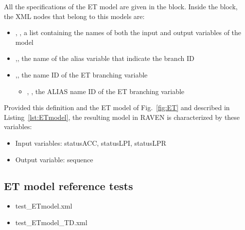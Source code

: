 All the specifications of the ET model are given in the 
 block. 
Inside the  block, the XML
nodes that belong to this models are:
\begin{itemize}
  \item  {}, , a list containing the names of both the input and output variables of the model
  \item  {},, the name of the alias variable that indicate the branch ID
  \item  {},, the name ID of the ET branching variable
	  \begin{itemize}
	    \item {}, , the ALIAS name ID of the ET branching variable
	  \end{itemize}
\end{itemize}

Provided this definition and the ET model of Fig.~\ref{fig:ET} and described in Listing~\ref{lst:ETmodel}, 
the resulting model in RAVEN is characterized by these variables:
\begin{itemize}
	\item Input variables: statusACC, statusLPI, statusLPR
	\item Output variable: sequence
\end{itemize}

\subsection{ET model reference tests}
\begin{itemize}
	\item test\_ETmodel.xml
	\item test\_ETmodel\_TD.xml
\end{itemize}



